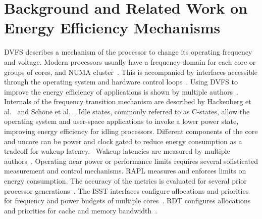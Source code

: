 \chapter{Background and Related Work on Energy Efficiency Mechanisms}
\label{sec:background}

\ac{DVFS} describes a mechanism of the processor to change its operating frequency and voltage.
Modern processors usually have a frequency domain for each core or groups of cores, and \ac{NUMA} cluster~\cite{Intel_2017_Skylake_SP,Schoene_2024_Alder_Lake,Schoene_2021_Zen2}.
This is accompanied by interfaces accessible through the operating system and hardware control loops~\cite{intel_pstate_kernel_doc,Kernel_IntelSpeedSelect}.
Using \ac{DVFS} to improve the energy efficiency of applications is shown by multiple authors~\cite{Gocht_2019_QLearning,Vysocky_2018_HPCTuning}.
Internals of the frequency transition mechanism are described by Hackenberg et al.~\cite{Hackenberg_2015_Haswell} and Schöne et al.~\cite{Intel_2017_Skylake_SP,Schoene_2021_Zen2,Schoene_2024_Alder_Lake}.
Idle states, commonly referred to as C-states, allow the operating system and user-space applications to invoke a lower power state, improving energy efficiency for idling processors.
Different components of the core and uncore can be power and clock gated to reduce energy consumption as a tradeoff for wakeup latency.~\cite{Intel_PowerManagementTechnologyReviewIceLake,Kuns_2025_UserSpaceIdle}
Wakeup latencies are measured by multiple authors~\cite{Hackenberg_2015_Haswell,Intel_2017_Skylake_SP,Schoene_2021_Zen2,Schoene_2024_Alder_Lake,Smejkal_2024_SleepWell}.
Operating near power or performance limits requires several sofisticated measurement and control mechanisms.
\ac{RAPL} measures and enforces limits on energy consumption.
The accuracy of the metrics is evaluated for several prior processor generations~\cite{Haehnel_2012_RAPL,Hackenberg_2015_Haswell,Intel_2017_Skylake_SP,AMD_Zen2_Overview,Schoene_2024_Alder_Lake}.
The \ac{ISST} interfaces configure allocations and priorities for frequency and power budgets of multiple cores~\cite{Kernel_IntelSpeedSelect,Intel_2021_HPM}.
\ac{RDT} configures allocations and priorities for cache and memory bandwidth~\cite{Sohal_2022_RDT,Intel_2021_HPM}.